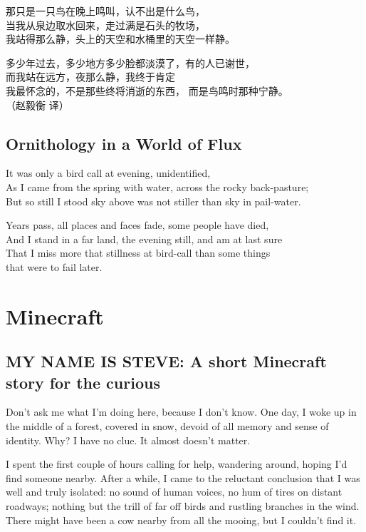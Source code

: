 \documentclass[]{book}
\renewenvironment{quote}{\begin{VF}}{\end{VF}}
\begin{document}
\begin{quote}
那只是一只鸟在晚上鸣叫，认不出是什么鸟，\\
当我从泉边取水回来，走过满是石头的牧场，\\
我站得那么静，头上的天空和水桶里的天空一样静。

多少年过去，多少地方多少脸都淡漠了，有的人已谢世，\\
而我站在远方，夜那么静，我终于肯定\\
我最怀念的，不是那些终将消逝的东西， 而是鸟鸣时那种宁静。\\
（赵毅衡 译）
\end{quote}

\section{Ornithology in a World of
Flux}\label{ornithology-in-a-world-of-flux}

\begin{quote}
It was only a bird call at evening, unidentified,\\
As I came from the spring with water, across the rocky back-pasture;\\
But so still I stood sky above was not stiller than sky in pail-water.

Years pass, all places and faces fade, some people have died,\\
And I stand in a far land, the evening still, and am at last sure\\
That I miss more that stillness at bird-call than some things\\
that were to fail later.
\end{quote}

\chapter{Minecraft}\label{minecraft}

\section{MY NAME IS STEVE: A short Minecraft story for the
curious}\label{my-name-is-steve-a-short-minecraft-story-for-the-curious}

Don't ask me what I'm doing here, because I don't know. One day, I woke
up in the middle of a forest, covered in snow, devoid of all memory and
sense of identity. Why? I have no clue. It almost doesn't matter.

I spent the first couple of hours calling for help, wandering around,
hoping I'd find someone nearby. After a while, I came to the reluctant
conclusion that I was well and truly isolated: no sound of human voices,
no hum of tires on distant roadways; nothing but the trill of far off
birds and rustling branches in the wind. There might have been a cow
nearby from all the mooing, but I couldn't find it.
\end{document}
